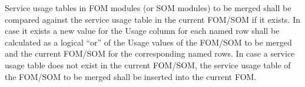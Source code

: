 \newpage
\begingroup
\annexcbodyfont
\setlength{\parskip}{12pt plus 1pt minus 1pt}
Service usage tables in FOM modules (or SOM modules) to be merged shall be compared against the service usage table in the current FOM/SOM if it exists. In case it exists a new value for the Usage column for each named row shall be calculated as a logical ``or'' of the Usage values of the FOM/SOM to be merged and the current FOM/SOM for the corresponding named rows. In case a service usage table does not exist in the current FOM/SOM, the service usage table of the FOM/SOM to be merged shall be inserted into the current FOM.
\endgroup

\let\annexchead\relax
\let\annexcsubhead\relax
\let\annexcstdnote\relax
\let\annexcbodyfont\relax
